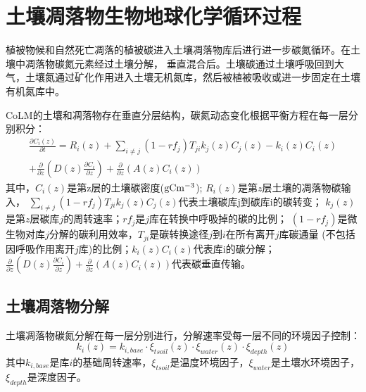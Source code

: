 \chapter{土壤凋落物生物地球化学循环过程}\label{土壤凋落物生物地球化学循环过程}

植被物候和自然死亡凋落的植被碳进入土壤凋落物库后进行进一步碳氮循环。在土壤中凋落物碳氮元素经过土壤分解，
垂直混合后。土壤碳通过土壤呼吸回到大气，土壤氮通过矿化作用进入土壤无机氮库，然后被植被吸收或进一步固定在土壤有机氮库中。

CoLM的土壤和凋落物存在垂直分层结构，碳氮动态变化根据平衡方程在每一层分别积分：
\begin{equation}
\begin{array}{r}\frac{\partial C_{i}(z)}{\partial t}=R_{i}(z)+\sum_{i \neq j}\left(1-r f_{j}\right) T_{j i} k_{j}(z) C_{j}(z)-k_{i}(z) C_{i}(z) \\ +\frac{\partial}{\partial z}\left(D(z) \frac{\partial C_{i}}{\partial z}\right)+\frac{\partial}{\partial z}\left(A(z) C_{i}(z)\right)\end{array}
\end{equation}
其中，$C_i\left(z\right)$是第z层的土壤碳密度($\rm gC m^{-3}$); $R_i\left(z\right)$是第$z$层土壤的凋落物碳输入，
$\sum_{i\neq j}{\left(1-{rf}_j\right)T_{ji}k_j\left(z\right)C_j\left(z\right)}$代表土壤碳库j到碳库i的碳转变；
$k_j\left(z\right)$是第$z$层碳库$j$的周转速率；${rf}_j$是$j$库在转换中呼吸掉的碳的比例；
$\left(1-{rf}_j\right)$是微生物对库$j$分解的碳利用效率，$T_{ji}$是碳转换途径$j$到$i$在所有离开$j$库碳通量
(不包括因呼吸作用离开$j$库)的比例；$k_i\left(z\right)C_i\left(z\right)$代表库i的碳分解；
$\frac{\partial}{\partial z}\left(D\left(z\right)\frac{\partial C_i}{\partial z}\right)+\frac{\partial}{\partial z}\left(A\left(z\right)C_i\left(z\right)\right)$代表碳垂直传输。

\section{土壤凋落物分解}\label{土壤凋落物分解}
土壤凋落物碳氮分解在每一层分别进行，分解速率受每一层不同的环境因子控制：
\begin{equation}
k_{i}(z)=k_{i,base} \cdot \xi_{tsoil}(z) \cdot \xi_{water}(z) \cdot \xi_{depth}(z)
\end{equation}
其中$k_{i,base}$是库$i$的基础周转速率，$\xi_{tsoil}$是温度环境因子，$\xi_{water}$是土壤水环境因子，$\xi_{depth}$是深度因子。

